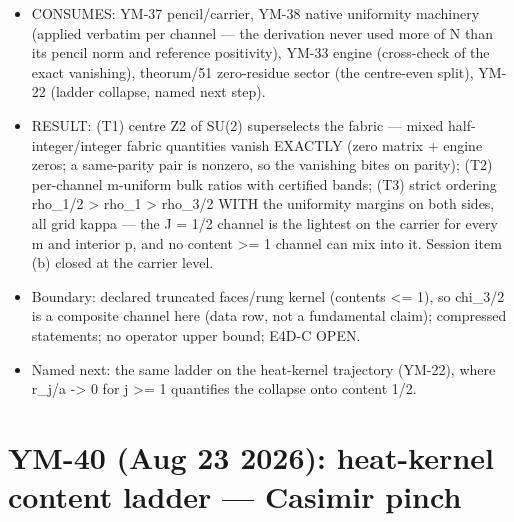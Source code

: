 \begin{itemize}
\tightlist
\item
  CONSUMES: YM-37 pencil/carrier, YM-38 native uniformity machinery
  (applied verbatim per channel --- the derivation never used more of N
  than its pencil norm and reference positivity), YM-33 engine
  (cross-check of the exact vanishing), theorum/51 zero-residue sector
  (the centre-even split), YM-22 (ladder collapse, named next step).
\item
  RESULT: (T1) centre Z2 of SU(2) superselects the fabric --- mixed
  half-integer/integer fabric quantities vanish EXACTLY (zero matrix +
  engine zeros; a same-parity pair is nonzero, so the vanishing bites
  on parity); (T2) per-channel m-uniform bulk ratios with certified
  bands; (T3) strict ordering rho\_1/2 \textgreater{} rho\_1 \textgreater{} rho\_3/2 WITH the
  uniformity margins on both sides, all grid kappa --- the J = 1/2
  channel is the lightest on the carrier for every m and interior p,
  and no content \textgreater= 1 channel can mix into it. Session item (b) closed
  at the carrier level.
\item
  Boundary: declared truncated faces/rung kernel (contents \textless= 1), so
  chi\_3/2 is a composite channel here (data row, not a fundamental
  claim); compressed statements; no operator upper bound; E4D-C OPEN.
\item
  Named next: the same ladder on the heat-kernel trajectory (YM-22),
  where r\_j/a -\textgreater{} 0 for j \textgreater= 1 quantifies the collapse onto content 1/2.
\end{itemize}

\hypertarget{ym-40-aug-23-2026-heat-kernel-content-ladder-casimir-pinch}{%
\section{YM-40 (Aug 23 2026): heat-kernel content ladder --- Casimir pinch}\label{ym-40-aug-23-2026-heat-kernel-content-ladder-casimir-pinch}}

